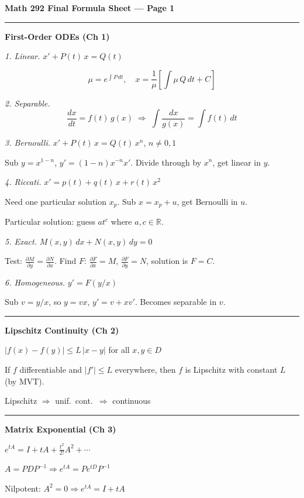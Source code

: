 \documentclass[10pt]{article}
\renewcommand{\large}{\fontsize{11pt}{14pt}\selectfont}
\newcommand{\R}{\mathbb{R}}
\newcommand{\heading}[1]{\bigskip\hrule\vspace{5pt}\textbf{#1}\vspace{8pt}\par}
\newcommand{\sub}[1]{\bigskip\textit{#1.}\;}
\newlength{\colw}
\begin{document}
\begin{center}
  {\large\textbf{Math 292 Final Formula Sheet --- Page 1}}
\end{center}

\noindent
\begin{minipage}[t]{\colw}

  \heading{First-Order ODEs (Ch 1)}

  \vspace{-12pt}

  \sub{1. Linear} $x' + P(t)\,x = Q(t)$

  \[
    \mu = e^{\int P\,dt}, \quad x = \frac{1}{\mu}\!\left[\int \mu\, Q\,dt + C\right]
  \]


  \sub{2. Separable}
  \[
    \frac{dx}{dt} = f(t)\,g(x) \;\Rightarrow\; \int\frac{dx}{g(x)}=\int f(t)\,dt
  \]

  \sub{3. Bernoulli} $x' + P(t)\,x = Q(t)\,x^n$, \; $n\ne 0,1$

  Sub $y=x^{1-n}$, \; $y'=(1-n)x^{-n}x'$. Divide through by $x^n$, get linear in $y$.

  \sub{4. Riccati} $x' = p(t) + q(t)\,x + r(t)\,x^2$

  Need one particular solution $x_p$. Sub $x=x_p+u$, get Bernoulli in $u$.

  Particular solution: guess $at^c$ where $a,c\in\R$.

  \sub{5. Exact} $M(x,y)\,dx + N(x,y)\,dy = 0$

  Test: $\frac{\partial M}{\partial y} = \frac{\partial N}{\partial x}$. Find $F$: $\frac{\partial F}{\partial x}=M$, $\frac{\partial F}{\partial y}=N$, solution is $F=C$.

  \sub{6. Homogeneous} $y' = F(y/x)$

  Sub $v=y/x$, so $y=vx$, $y'=v+xv'$. Becomes separable in $v$.

  \heading{Lipschitz Continuity (Ch 2)}

  $|f(x)-f(y)|\le L\,|x-y|$ for all $x,y\in D$

  If $f$ differentiable and $|f'|\le L$ everywhere, then $f$ is Lipschitz with constant $L$ (by MVT).

  Lipschitz $\Rightarrow$ unif.\ cont.\ $\Rightarrow$ continuous

  \heading{Matrix Exponential (Ch 3)}

  $e^{tA} = I + tA + \frac{t^2}{2!}A^2 + \cdots$

  $A=PDP^{-1}\Rightarrow e^{tA}=Pe^{tD}P^{-1}$

  Nilpotent: $A^2=0 \Rightarrow e^{tA}=I+tA$


\end{minipage}
\end{document}
